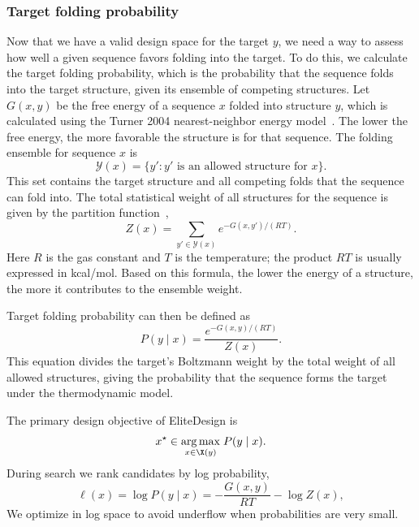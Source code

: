 \subsubsection{Target folding probability}
Now that we have a valid design space for the target $y$,
we need a way to assess how well a given sequence favors folding
into the target. To do this, we calculate the target folding probability,
which is the probability that the sequence folds into the target structure,
given its ensemble of competing structures. Let $G(x,y)$ be the free energy of
a sequence $x$ folded into structure $y$, which is calculated using the Turner
2004 nearest-neighbor energy model~\citep{mathews2004}. The lower the free energy, the more favorable the
structure is for that sequence. The folding ensemble for sequence $x$ is
\begin{equation}
 \mathcal{Y}(x)=\{y': y'\text{ is an allowed structure for }x\}.
\end{equation}
This set contains the target structure and all competing folds that the sequence
can fold into. The total statistical weight of all structures for the sequence
is given by the partition function~\citep{mccaskill1990},
\begin{equation}
 Z(x)=\sum_{y'\in\mathcal{Y}(x)}e^{-G(x,y')/(RT)}.
 \label{eq:partition}
\end{equation}
Here $R$ is the gas constant and $T$ is the temperature;
the product $RT$ is usually expressed in kcal/mol. Based on this formula,
the lower the energy of a structure, the more it contributes to the ensemble weight.

Target folding probability can then be defined as
\begin{equation}
 P(y\mid x)=\frac{e^{-G(x,y)/(RT)}}{Z(x)}.
 \label{eq:probability}
\end{equation}
This equation divides the target's Boltzmann weight by the total weight of all
allowed structures, giving the probability that the sequence forms the target under the thermodynamic model.

The primary design objective of EliteDesign is
\begin{equation}
 x^\star\in\underset{x\in\X(y)}{\arg\max}\;P(y\mid x).
 \label{eq:design}
\end{equation}
During search we rank candidates by log probability,
\begin{equation}
 \ell(x)=\log P(y\mid x)
 =-\frac{G(x,y)}{RT}-\log Z(x),
 \label{eq:logprob}
\end{equation}
We optimize in log space to avoid underflow when probabilities are very small.

